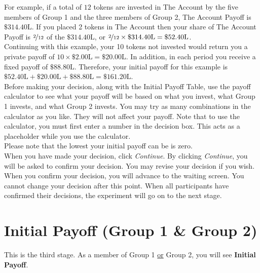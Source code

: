 \documentclass[12pt]{article}
\begin{document}
For example, if a total of $12$ tokens are invested in The Account by the five members of Group 1 and the three members of Group 2, The Account Payoff is $\$314.40\text{L}$.  If you placed 2 tokens in The Account then your share of The Account Payoff is $\nicefrac{2}{12}$ of the $\$314.40\text{L}$, or $\nicefrac{2}{12} \times \$314.40\text{L} = \$52.40\text{L}$.\\

Continuing with this example, your 10 tokens not invested would return you a private payoff of $10 \times \$2.00\text{L} = \$20.00\text{L}$. In addition, in each period you receive a fixed payoff of $\$88.80\text{L}$. Therefore, your initial payoff for this example is $\$52.40\text{L} + \$20.00\text{L} + \$88.80\text{L} = \$161.20\text{L}$.\\

Before making your decision, along with the Initial Payoff Table, use the payoff calculator to see what your payoff will be based on what you invest, what Group 1 invests, and what Group 2 invests. You may try as many combinations in the calculator as you like.  They will not affect your payoff. Note that to use the calculator, you must first enter a number in the decision box.  This acts as a placeholder while you use the calculator.\\ 

Please note that the lowest your initial payoff can be is zero.\\ 

When you have made your decision, click {\em Continue}.  By clicking {\em Continue}, you will be asked to confirm your decision.  You may revise your decision if you wish.  When you confirm your decision, you will advance to the waiting screen.  You cannot change your decision after this point. When all participants have confirmed their decisions, the experiment will go on to the next stage. \\ 



\section{Initial Payoff (Group 1 \& Group 2)}

This is the third stage. As a member of Group 1  \underline{or} Group 2, you will see {\bf Initial Payoff}.\\
\end{document}

